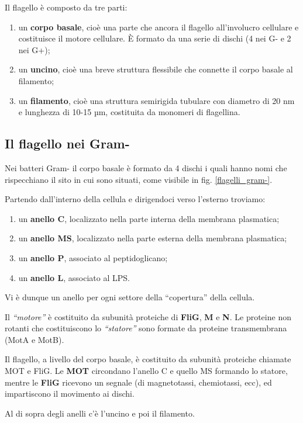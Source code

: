 \documentclass[11pt]{book}
\begin{document}
\clearpage
Il flagello è composto da tre parti:
\begin{enumerate}
\item un \textbf{corpo basale}, cioè una parte che ancora il flagello all’involucro cellulare e costituisce il motore cellulare. È formato da una serie di dischi (4 nei G- e 2 nei G+);
\item un \textbf{uncino}, cioè una breve struttura flessibile che connette il corpo basale al filamento;
\item un \textbf{filamento}, cioè una struttura semirigida tubulare con diametro di 20 nm e lunghezza di 10-15 µm, costituita da monomeri di flagellina.
\end{enumerate}

\subsection{Il flagello nei Gram-} 
Nei batteri Gram- il corpo basale è formato da 4 dischi i quali hanno nomi che rispecchiano il sito in cui sono situati, come visibile in fig. \ref{flagelli_gram-}.

Partendo dall’interno della cellula e dirigendoci verso l’esterno troviamo:
\begin{enumerate}
\item un \textbf{anello C}, localizzato nella parte interna della membrana plasmatica;
\item un \textbf{anello MS}, localizzato nella parte esterna della membrana plasmatica;
\item un \textbf{anello P}, associato al peptidoglicano;
\item un \textbf{anello L}, associato al LPS.
\end{enumerate}

Vi è dunque un anello per ogni settore della “copertura” della cellula.

Il \emph{``motore''} è costituito da subunità proteiche di \textbf{FliG}, \textbf{M }e \textbf{N}. Le proteine non rotanti che costituiscono lo \emph{``statore''} sono formate da proteine transmembrana (MotA e MotB).

Il flagello, a livello del corpo basale, è costituito da subunità proteiche chiamate MOT e FliG.
Le \textbf{MOT} circondano l’anello C e quello MS  formando lo statore, mentre le \textbf{FliG} ricevono un segnale (di magnetotassi, chemiotassi, ecc), ed impartiscono il movimento ai dischi.

Al di sopra degli anelli c’è l’uncino e poi il filamento.
\end{document}
